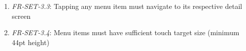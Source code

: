 \documentclass[conference]{IEEEtran}
\begin{document}
\begin{enumerate}
\begin{enumerate}
\begin{itemize}
                                    \item My Devices (with device icon)
                                    \item Location (with location/pin icon)
                                    \item Privacy (with shield/lock icon)
                                \end{itemize}
                            \item \textit{FR-SET-3.3}: Tapping any menu item must navigate to its respective detail screen
                            \item \textit{FR-SET-3.4}: Menu items must have sufficient touch target size (minimum 44pt height)
                        \end{enumerate}
                \end{enumerate}
\end{document}
